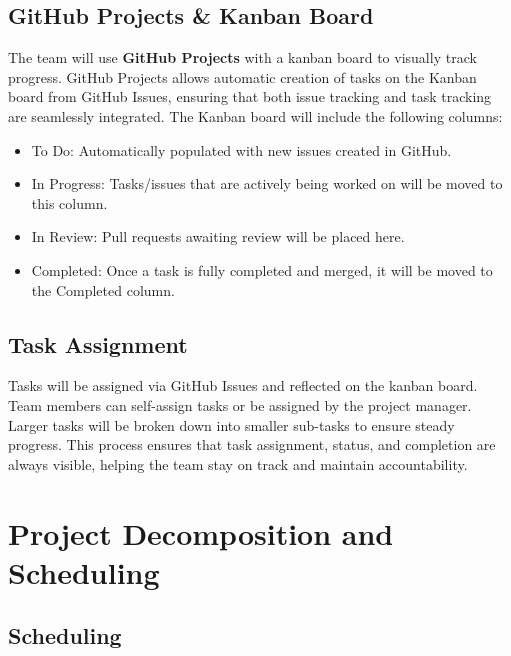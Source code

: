 \documentclass{article}
\begin{document}
\subsection{GitHub Projects \& Kanban Board}
The team will use \textbf{GitHub Projects} with a kanban board to visually track progress. GitHub Projects allows automatic creation of tasks on the Kanban board from GitHub Issues, ensuring that both issue tracking and task tracking are seamlessly integrated. The Kanban board will include the following columns:
\begin{itemize}
    \item To Do: Automatically populated with new issues created in GitHub.
    \item In Progress: Tasks/issues that are actively being worked on will be moved to this column.
    \item In Review: Pull requests awaiting review will be placed here.
    \item Completed: Once a task is fully completed and merged, it will be moved to the Completed column.
\end{itemize}

\subsection{Task Assignment}
Tasks will be assigned via GitHub Issues and reflected on the kanban board. Team members can self-assign tasks or be assigned by the project manager. Larger tasks will be broken down into smaller sub-tasks to ensure steady progress. This process ensures that task assignment, status, and completion are always visible, helping the team stay on track and maintain accountability.


\section{Project Decomposition and Scheduling}

\subsection{Scheduling}
\end{document}
